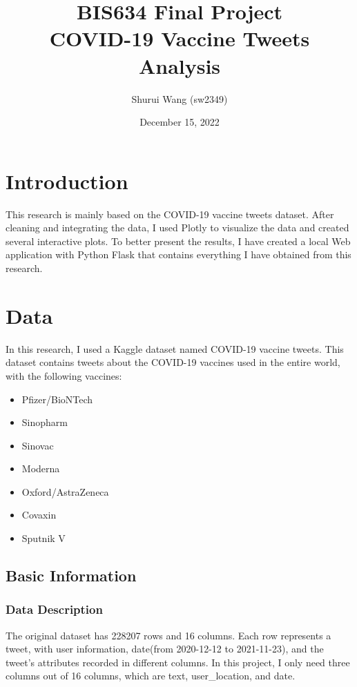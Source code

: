 \documentclass{article}
\title{
		\usefont{OT1}{bch}{b}{n}
		BIS634 Final Project \\
		COVID-19 Vaccine Tweets Analysis\\
}
\author{Shurui Wang (sw2349)}
\date{December 15, 2022}
\begin{document}
\maketitle
\thispagestyle{empty}
\newpage
{} 
\section{Introduction}

This research is mainly based on the COVID-19 vaccine tweets dataset. After cleaning and integrating the data, I used Plotly to visualize the data and created several interactive plots. To better present the results, I have created a local Web application with Python Flask that contains everything I have obtained from this research.

\section{Data}

In this research, I used a Kaggle dataset named COVID-19 vaccine tweets. This dataset contains tweets about the COVID-19 vaccines used in the entire world, with the following vaccines:
\begin{itemize}
  \item Pfizer/BioNTech
  \item Sinopharm
  \item Sinovac
  \item Moderna
  \item Oxford/AstraZeneca
  \item Covaxin
  \item Sputnik V
\end{itemize}

\subsection{Basic Information}

\subsubsection{Data Description}

The original dataset has 228207 rows and 16 columns. Each row represents a tweet, with user information, date(from 2020-12-12 to 2021-11-23), and the tweet's attributes recorded in different columns. In this project, I only need three columns out of 16 columns, which are text, user\_location, and date.
\end{document}
